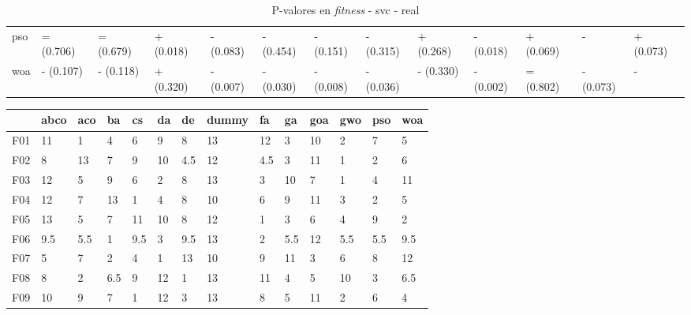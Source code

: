 \begin{table}
\begin{adjustbox}{width=\linewidth}
\begin{tabular}{lllllllllllll}
            pso   & = (0.706) & = (0.679) & + (0.018)     & - (0.083)     & - (0.454)     & - (0.151) & - (0.315) & + (0.268)     & - (0.018)     & + (0.069)     & -         & + (0.073) \\
            woa   & - (0.107) & - (0.118) & + (0.320)     & - (0.007)     & - (0.030)     & - (0.008) & - (0.036) & - (0.330)     & - (0.002)     & = (0.802)     & - (0.073) & -         \\
            \bottomrule
        \end{tabular}
    \end{adjustbox}
    \caption{P-valores en \textit{fitness} - svc - real}
    \label{tab:p_values_fitness_real_svc}
\end{table}

\begin{table}
    \begin{adjustbox}{width=\linewidth}
        \begin{tabular}{llllllllllllll}
            \toprule
            {}   & abco  & aco   & ba    & cs    & da    & de    & dummy  & fa    & ga    & goa   & gwo   & pso   & woa   \\
            \midrule
            F01  & 11    & 1     & 4     & 6     & 9     & 8     & 13     & 12    & 3     & 10    & 2     & 7     & 5     \\
            F02  & 8     & 13    & 7     & 9     & 10    & 4.5   & 12     & 4.5   & 3     & 11    & 1     & 2     & 6     \\
            F03  & 12    & 5     & 9     & 6     & 2     & 8     & 13     & 3     & 10    & 7     & 1     & 4     & 11    \\
            F04  & 12    & 7     & 13    & 1     & 4     & 8     & 10     & 6     & 9     & 11    & 3     & 2     & 5     \\
            F05  & 13    & 5     & 7     & 11    & 10    & 8     & 12     & 1     & 3     & 6     & 4     & 9     & 2     \\
            F06  & 9.5   & 5.5   & 1     & 9.5   & 3     & 9.5   & 13     & 2     & 5.5   & 12    & 5.5   & 5.5   & 9.5   \\
            F07  & 5     & 7     & 2     & 4     & 1     & 13    & 10     & 9     & 11    & 3     & 6     & 8     & 12    \\
            F08  & 8     & 2     & 6.5   & 9     & 12    & 1     & 13     & 11    & 4     & 5     & 10    & 3     & 6.5   \\
            F09  & 10    & 9     & 7     & 1     & 12    & 3     & 13     & 8     & 5     & 11    & 2     & 6     & 4     \\

\end{tabular}
\end{adjustbox}
\end{table}
